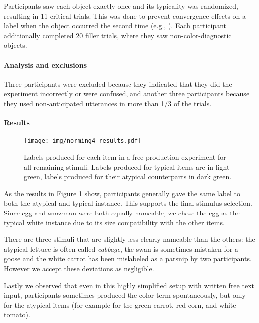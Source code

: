 \documentclass[a4paper,man,floatsintext,natbib,donotrepeattitle]{apa6}
\begin{document}
Participants saw each object exactly once and its typicality was randomized, resulting in 11 critical trials. This was done to prevent convergence effects on a label when the object occurred the second time (e.g., \cite{Clark:1986}). Each participant additionally completed 20 filler trials, where they saw non-color-diagnostic objects.

\paragraph{Analysis and exclusions}
Three participants were excluded because they indicated that they did the experiment incorrectly or were confused, and another three participants because they used non-anticipated utterances in more than 1/3 of the trials.

\paragraph{Results}

\begin{figure}
	\texttt{[image: img/norming4\_results.pdf]}
	\caption{Labels produced for each item in a free production experiment for all remaining stimuli. Labels produced for typical items are in light green, labels produced for their atypical counterparts in dark green.}
	\label{fig:norming4results}
\end{figure}

As the results in Figure \ref{fig:norming4results} show, participants generally gave the same label to both the atypical and typical instance. This supports the final stimulus selection. 
Since egg and snowman were both equally nameable, we chose the egg as the typical white instance due to its size compatibility with the other items. 

There are three stimuli that are slightly less clearly nameable than the others: the atypical lettuce is often called \textit{cabbage}, the swan is sometimes mistaken for a goose and the white carrot has been mislabeled as a parsnip by two participants. However we accept these deviations as negligible.

Lastly we observed that even in this highly simplified setup with written free text input, participants sometimes produced the color term spontaneously, but only for the atypical items (for example for the green carrot, red corn, and white tomato).



\end{document}
